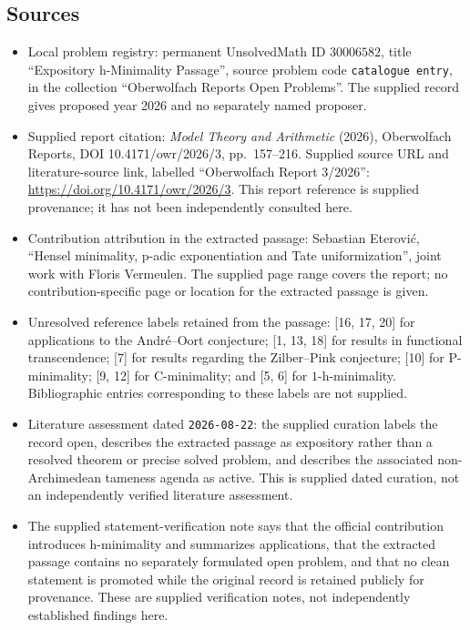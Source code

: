 \documentclass[11pt]{article}
\begin{document}
\subsection{Sources}
\begin{itemize}
\item Local problem registry: permanent UnsolvedMath ID \(30006582\), title ``Expository h-Minimality Passage'', source problem code \texttt{catalogue entry}, in the collection ``Oberwolfach Reports Open Problems''. The supplied record gives proposed year 2026 and no separately named proposer.
\item Supplied report citation: \emph{Model Theory and Arithmetic} (2026), Oberwolfach Reports, DOI 10.4171/owr/2026/3, pp.~157--216. Supplied source URL and literature-source link, labelled ``Oberwolfach Report 3/2026'': \url{https://doi.org/10.4171/owr/2026/3}. This report reference is supplied provenance; it has not been independently consulted here.
\item Contribution attribution in the extracted passage: Sebastian Eterovi\'{c}, ``Hensel minimality, p-adic exponentiation and Tate uniformization'', joint work with Floris Vermeulen. The supplied page range covers the report; no contribution-specific page or location for the extracted passage is given.
\item Unresolved reference labels retained from the passage: [16, 17, 20] for applications to the Andr\'{e}--Oort conjecture; [1, 13, 18] for results in functional transcendence; [7] for results regarding the Zilber--Pink conjecture; [10] for P-minimality; [9, 12] for C-minimality; and [5, 6] for \(1\)-h-minimality. Bibliographic entries corresponding to these labels are not supplied.
\item Literature assessment dated \texttt{2026-08-22}: the supplied curation labels the record open, describes the extracted passage as expository rather than a resolved theorem or precise solved problem, and describes the associated non-Archimedean tameness agenda as active. This is supplied dated curation, not an independently verified literature assessment.
\item The supplied statement-verification note says that the official contribution introduces h-minimality and summarizes applications, that the extracted passage contains no separately formulated open problem, and that no clean statement is promoted while the original record is retained publicly for provenance. These are supplied verification notes, not independently established findings here.
\end{itemize}
\end{document}
